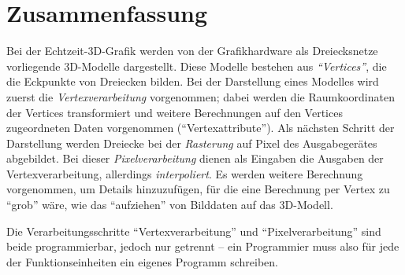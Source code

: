 \documentclass[twoside,a4paper,fleqn,12pt]{book}
\begin{document}
\section{Zusammenfassung}

Bei der Echtzeit-3D-Grafik werden von der Grafikhardware als Dreiecksnetze vorliegende 3D-Modelle dargestellt.
Diese Modelle bestehen aus \emph{``Vertices''}, die die Eckpunkte von Dreiecken bilden. Bei der Darstellung eines
Modelles wird zuerst die \emph{Vertexverarbeitung} vorgenommen; dabei werden die Raumkoordinaten der Vertices transformiert
und weitere Berechnungen auf den Vertices zugeordneten Daten vorgenommen ("`Vertexattribute"').
Als nächsten Schritt der Darstellung werden Dreiecke bei der \emph{Rasterung} auf Pixel des Ausgabegerätes abgebildet.
Bei dieser \emph{Pixelverarbeitung} dienen als Eingaben die Ausgaben der Vertexverarbeitung, allerdings \emph{interpoliert}.
Es werden weitere Berechnung vorgenommen, um Details hinzuzufügen, für die eine Berechnung per Vertex zu "`grob"' wäre,
wie das "`aufziehen"' von Bilddaten auf das 3D-Modell.

Die Verarbeitungsschritte "`Vertexverarbeitung"' und "`Pixelverarbeitung"' sind beide programmierbar, 
jedoch nur getrennt -- ein Programmier muss also für jede der Funktionseinheiten ein eigenes Programm schreiben.



\end{document}
